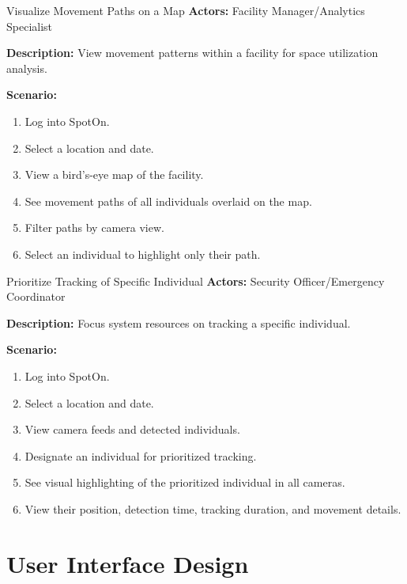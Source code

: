 \begin{usecase}{Visualize Movement Paths on a Map}
    \textbf{Actors:} Facility Manager/Analytics Specialist
    
    \textbf{Description:} View movement patterns within a facility for space utilization analysis.
    
    \textbf{Scenario:}
    \begin{enumerate}[leftmargin=80pt]
        \item Log into SpotOn.
        \item Select a location and date.
        \item View a bird's-eye map of the facility.
        \item See movement paths of all individuals overlaid on the map.
        \item Filter paths by camera view.
        \item Select an individual to highlight only their path.
    \end{enumerate}
\end{usecase}

\begin{usecase}{Prioritize Tracking of Specific Individual}
    \textbf{Actors:} Security Officer/Emergency Coordinator
    
    \textbf{Description:} Focus system resources on tracking a specific individual.
    
    \textbf{Scenario:}
    \begin{enumerate}[leftmargin=80pt]
        \item Log into SpotOn.
        \item Select a location and date.
        \item View camera feeds and detected individuals.
        \item Designate an individual for prioritized tracking.
        \item See visual highlighting of the prioritized individual in all cameras.
        \item View their position, detection time, tracking duration, and movement details.
    \end{enumerate}
\end{usecase}


\section{User Interface Design}
\label{section:user-interface-design}

